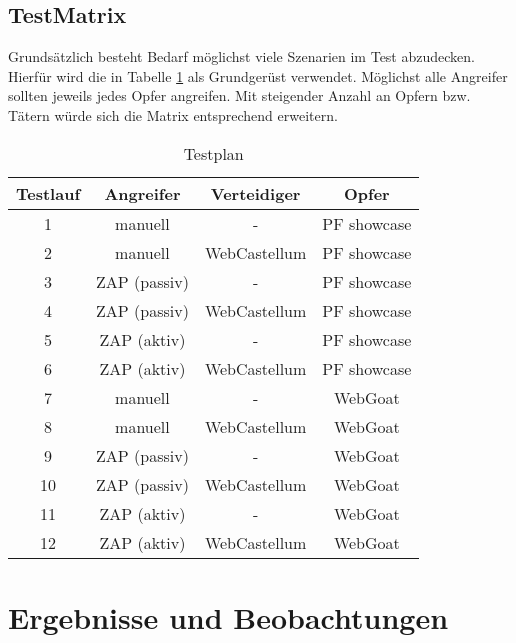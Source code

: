 \subsection{TestMatrix}
Grundsätzlich besteht Bedarf möglichst viele Szenarien im Test abzudecken. Hierfür wird die in Tabelle \ref{tab:testplan} als Grundgerüst verwendet. Möglichst alle Angreifer sollten jeweils jedes Opfer angreifen. Mit steigender Anzahl an Opfern bzw. Tätern würde sich die Matrix entsprechend erweitern. 

\begin{table}[h]
    \centering
    \begin{tabular}{cccc} 
      \toprule
    \textbf{Testlauf} & \textbf{Angreifer} & \textbf{Verteidiger} & \textbf{Opfer} \\ 
     \midrule
     1 & manuell & - & PF showcase\\
     2 & manuell & WebCastellum & PF showcase \\
     3 & ZAP (passiv) & - & PF showcase\\
     4 & ZAP (passiv) & WebCastellum & PF showcase \\
     5 & ZAP (aktiv) & - & PF showcase\\
     6 & ZAP (aktiv) & WebCastellum & PF showcase \\
     7 & manuell & - & WebGoat \\ 
    8 & manuell & WebCastellum & WebGoat \\
    9 & ZAP (passiv) & - & WebGoat \\ 
    10 & ZAP (passiv) & WebCastellum & WebGoat \\
    11 & ZAP (aktiv) & - & WebGoat \\ 
    12 & ZAP (aktiv) & WebCastellum & WebGoat \\
   \bottomrule
    \end{tabular}
    \caption{Testplan}
    \label{tab:testplan}
\end{table}

\section{Ergebnisse und Beobachtungen}




